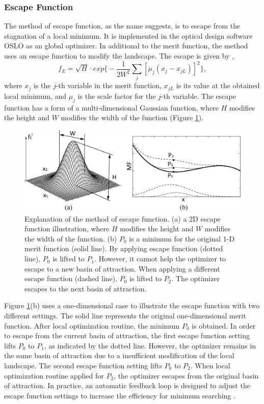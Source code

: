 \subsubsection{Escape Function}
The method of escape function, as the name suggests, is to escape from the stagnation of a local minimum. It is implemented in the optical design software OSLO \cite{OsloSW} as an global optimizer. In additional to the merit function, the method uses an escape function to modify the landscape. The escape is given by \cite{Isshiki1998},
\begin{equation}
f_{E} = \sqrt{H} \cdot exp \Bigg\{ - \frac{1}{2W^{2}}\sum_{j} \left[\mu_{j}(x_j - x_{jL}) \right]^2 \Bigg\}, 
\end{equation}where $x_j$ is the $j$-th variable in the merit function, $x_{jL}$ is its value at the obtained local minimum, and $\mu_j$ is the scale factor for the $j$-th variable. The escape function has a form of a multi-dimensional Gaussian function, where $H$ modifies the height and $W$ modifies the width of the function (Figure \ref{fig: Escape_function_explained}). 
\begin{figure}
    \centering
    \includegraphics[scale=0.58]{chapter-1/figures/EscapeFunction_explained.png}
    \caption{Explanation of the method of escape function. (a) a 2D escape function illustration, where $H$ modifies the height and $W$ modifies the width of the function. (b) $P_0$ is a minimum for the original 1-D merit function (solid line). By applying escape function (dotted line), $P_0$ is lifted to $P_1$. However, it cannot help the optimizer to escape to a new basin of attraction. When applying a different escape function (dashed line), $P_0$ is lifted to $P_2$. The optimizer escapes to the next basin of attraction.}
    \label{fig: Escape_function_explained}
\end{figure}
Figure \ref{fig: Escape_function_explained}(b) uses a one-dimensional case to illustrate the escape function with two different settings. The solid line represents the original one-dimensional merit function. After local optimization routine, the minimum $P_0$ is obtained. In order to escape from the current basin of attraction, the first escape function setting lifts $P_0$ to $P_1$, as indicated by the dotted line. However, the optimizer remains in the same basin of attraction due to a insufficient modification of the local landscape. The second escape function setting lifts $P_0$ to $P_2$. When local optimization routine applied for $P_2$, the optimizer escapes from the original basin of attraction. In practice, an automatic feedback loop is designed to adjust the escape function settings to increase the efficiency for minimum searching \cite{Isshiki1998}.


